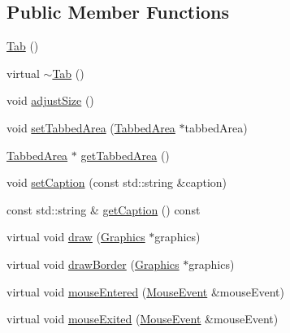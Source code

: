 \subsection*{Public Member Functions}
\begin{DoxyCompactItemize}
\item 
\hyperlink{classgcn_1_1Tab_adcbc5f154b1aec324beba6eac4c701db}{Tab} ()
\item 
virtual \hyperlink{classgcn_1_1Tab_ab72b2bed8aff33cbf6311c3f8c23d81f}{$\sim$\+Tab} ()
\item 
void \hyperlink{classgcn_1_1Tab_af485fff985502edc64bb4b46b6c2900e}{adjust\+Size} ()
\item 
void \hyperlink{classgcn_1_1Tab_a47675b463cba120b6aff006e8f850311}{set\+Tabbed\+Area} (\hyperlink{classgcn_1_1TabbedArea}{Tabbed\+Area} $\ast$tabbed\+Area)
\item 
\hyperlink{classgcn_1_1TabbedArea}{Tabbed\+Area} $\ast$ \hyperlink{classgcn_1_1Tab_aad047e37efa76663e44f01d35d9c7926}{get\+Tabbed\+Area} ()
\item 
void \hyperlink{classgcn_1_1Tab_a2c312a8d89c9641a1a32813612a51dc5}{set\+Caption} (const std\+::string \&caption)
\item 
const std\+::string \& \hyperlink{classgcn_1_1Tab_a9ded51d0d15437edec0a7f9edb7bec2c}{get\+Caption} () const 
\item 
virtual void \hyperlink{classgcn_1_1Tab_a4e4c7f8d8e3b883e3f0836cb76ab0ae6}{draw} (\hyperlink{classgcn_1_1Graphics}{Graphics} $\ast$graphics)
\item 
virtual void \hyperlink{classgcn_1_1Tab_a48f08dbcc6dd3a0b767e6d272fbe1487}{draw\+Border} (\hyperlink{classgcn_1_1Graphics}{Graphics} $\ast$graphics)
\item 
virtual void \hyperlink{classgcn_1_1Tab_a8f18f8c49721c7faf85e01d9562d0ceb}{mouse\+Entered} (\hyperlink{classgcn_1_1MouseEvent}{Mouse\+Event} \&mouse\+Event)
\item 
virtual void \hyperlink{classgcn_1_1Tab_a6769831c91c15dc87a81a32461ac5878}{mouse\+Exited} (\hyperlink{classgcn_1_1MouseEvent}{Mouse\+Event} \&mouse\+Event)
\end{DoxyCompactItemize}
